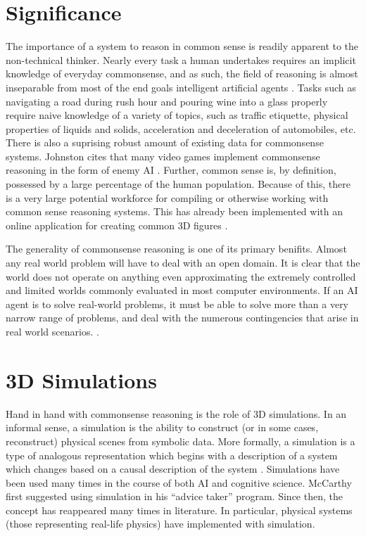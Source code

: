 \section{Significance}
The importance of a system to reason in common sense is readily apparent to the non-technical thinker. 
Nearly every task a human undertakes requires an implicit knowledge of everyday commonsense, and as such, the field of reasoning is almost inseparable from most of the end goals intelligent artificial agents \cite{johnston2009practical, johnston2008comirit}. 
Tasks such as navigating a road during rush hour and pouring wine into a glass properly require naive knowledge of a variety of topics, such as traffic etiquette, physical properties of liquids and solids, acceleration and deceleration of automobiles, etc. There is also a suprising robust amount of existing data for commonsense systems. Johnston cites that many video games implement commonsense reasoning in the form of enemy AI \cite{johnston2008comirit}. Further, common sense is, by definition, possessed by a large percentage of the human population. Because of this, there is a very large potential workforce for compiling or otherwise working with common sense reasoning systems. This has already been implemented with an online application for creating common 3D figures \cite{johnston2011collection}.

The generality of commonsense reasoning is one of its primary benifits. Almost any real world problem will have to deal with an open domain. It is clear that the world does not operate on anything even approximating the extremely controlled and limited worlds commonly evaluated in most computer environments. If an AI agent is to solve real-world problems, it must be able to solve more than a very narrow range of problems, and deal with the numerous contingencies that arise in real world scenarios. \cite{egg-cracking,johnston2009practical,johnston2008comirit,schubert2000episodic,mccarthy1963programs}.

\section{3D Simulations}
Hand in hand with commonsense reasoning is the role of 3D simulations. 
In an informal sense, a simulation is the ability to construct (or in some cases, reconstruct) physical scenes from symbolic data. 
More formally, a simulation is a type of analogous representation which begins with a description of a system which changes based on a causal description of the system \cite{gardin1989analogical}. Simulations have been used many times in the course of both AI and cognitive science. McCarthy first suggested using simulation in his ``advice taker'' program. Since then, the concept has reappeared many times in literature. In particular, physical systems (those representing real-life physics) have implemented with simulation.

